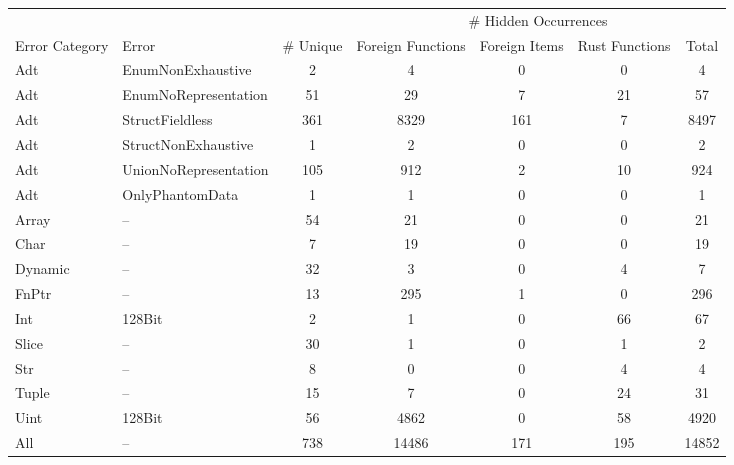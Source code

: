 \begin{tabular}{llc|cccc}
  \hline
  & & & \multicolumn{4}{c}{\# Hidden Occurrences} \\
 Error Category & Error & \# Unique & Foreign Functions & Foreign Items & Rust Functions & Total \\
 \hline
Adt & EnumNonExhaustive & 2 & 4 & 0 & 0 & 4 \\ 
  Adt & EnumNoRepresentation & 51 & 29 & 7 & 21 & 57 \\ 
  Adt & StructFieldless & 361 & 8329 & 161 & 7 & 8497 \\ 
  Adt & StructNonExhaustive & 1 & 2 & 0 & 0 & 2 \\ 
  Adt & UnionNoRepresentation & 105 & 912 & 2 & 10 & 924 \\ 
  Adt & OnlyPhantomData & 1 & 1 & 0 & 0 & 1 \\ 
  Array & -- & 54 & 21 & 0 & 0 & 21 \\ 
  Char & -- & 7 & 19 & 0 & 0 & 19 \\ 
  Dynamic & -- & 32 & 3 & 0 & 4 & 7 \\ 
  FnPtr & -- & 13 & 295 & 1 & 0 & 296 \\ 
  Int & 128Bit & 2 & 1 & 0 & 66 & 67 \\ 
  Slice & -- & 30 & 1 & 0 & 1 & 2 \\ 
  Str & -- & 8 & 0 & 0 & 4 & 4 \\ 
  Tuple & -- & 15 & 7 & 0 & 24 & 31 \\ 
  Uint & 128Bit & 56 & 4862 & 0 & 58 & 4920 \\ 
  All & -- & 738 & 14486 & 171 & 195 & 14852 \\ 
   \hline
\end{tabular}

